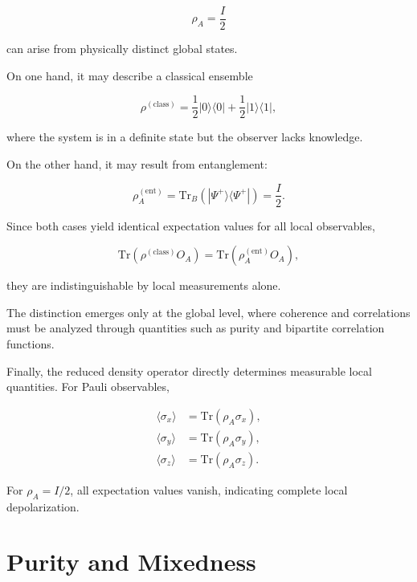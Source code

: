 \[
\rho_A
=
\frac{I}{2}
\]

can arise from physically distinct global states.

\medskip

On one hand, it may describe a classical ensemble

\[
\rho^{(\mathrm{class})}
=
\frac{1}{2}|0\rangle\langle 0|
+
\frac{1}{2}|1\rangle\langle 1|,
\]

where the system is in a definite state but the observer lacks knowledge.

On the other hand, it may result from entanglement:

\[
\rho_A^{(\mathrm{ent})}
=
\mathrm{Tr}_B
\left(
|\Psi^+\rangle\langle\Psi^+|
\right)
=
\frac{I}{2}.
\]

\medskip

Since both cases yield identical expectation values for all local observables,

\[
\mathrm{Tr}(\rho^{(\mathrm{class})} O_A)
=
\mathrm{Tr}(\rho_A^{(\mathrm{ent})} O_A),
\]

they are indistinguishable by local measurements alone.

The distinction emerges only at the global level, where coherence and correlations must be analyzed through quantities such as purity and bipartite correlation functions.

\medskip

Finally, the reduced density operator directly determines measurable local quantities. For Pauli observables,

\begin{align}
\langle \sigma_x \rangle
&=
\mathrm{Tr}(\rho_A \sigma_x),
\nonumber
\\
\langle \sigma_y \rangle
&=
\mathrm{Tr}(\rho_A \sigma_y),
\nonumber
\\
\langle \sigma_z \rangle
&=
\mathrm{Tr}(\rho_A \sigma_z).
\label{eq:local_pauli_expectations}
\end{align}

For \( \rho_A = I/2 \), all expectation values vanish, indicating complete local depolarization.


\section{Purity and Mixedness}

